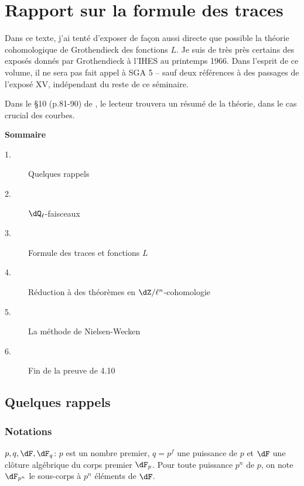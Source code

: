 
\chapter{Rapport sur la formule des traces}\label{II}

Dans ce texte, j'ai tenté d'exposer de façon aussi directe que possible la 
théorie cohomologique de Grothendieck des fonctions $L$. Je suis de très près 
certains des exposés donnés par Grothendieck à l'IHES au printemps 1966. Dans 
l'esprit de ce volume, il ne sera pas fait appel à SGA 5 -- sauf deux 
références à des passages de l'exposé XV, indépendant du reste de ce 
séminaire. 

Dans le \S 10 (p.81-90) de , le lecteur trouvera un résumé de la 
théorie, dans le cas crucial des courbes. 










\begin{center}\textbf{Sommaire}\end{center}
\begin{description}
\item[1.] Quelques rappels 
\item[2.] $\dQ_\ell$-faisceaux 
\item[3.] Formule des traces et fonctions $L$ 
\item[4.] Réduction à des théorèmes en $\dZ/\ell^n$-cohomologie 
\item[5.] La méthode de Nielsen-Wecken 
\item[6.] Fin de la preuve de 4.10 
\end{description}

\section{Quelques rappels}\label{II:1}





\subsection{Notations}\label{II:1-1}

$p,q,\dF,\dF_q$: $p$ est un nombre premier, $q=p^f$ une puissance de $p$ et 
$\dF$ une clôture algébrique du corps premier $\dF_p$. Pour toute puissance 
$p^n$ de $p$, on note $\dF_{p^n}$ le sous-corps à $p^n$ éléments de $\dF$. 

